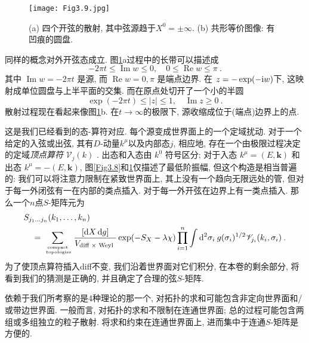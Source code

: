 \begin{figure}[h]
	\begin{center}
		\texttt{[image: Fig3.9.jpg]}\\
		\caption{(a) 四个开弦的散射, 其中弦源趋于$X^{0}=\pm \infty$. (b) 共形等价图像: 有凹痕的圆盘.}\label{Fig3.9}
	\end{center}
\end{figure}

同样的概念对外开弦态成立. 图\ref{Fig3.9}a过程中的长带可以描述成
\begin{equation}
-2 \pi t \leq \operatorname{Im} w \leq 0, \quad 0 \leq \operatorname{Re} w \leq \pi \:. \label{3.5.3}
\end{equation}
其中 $\operatorname{Im} w=-2 \pi t$ 是源, 而 $\operatorname{Re} w=0, \pi$ 是端点边界. 在 $z=-\exp (-\mathrm{i} w)$下, 这映射成单位圆盘与上半平面的交集. 而在原点处切开了一个小的半圆
\begin{equation}
\exp (-2 \pi t) \leq|z| \leq 1, \quad \operatorname{Im} z \geq 0 \:. \label{3.5.4}
\end{equation}
散射过程现在看起来像图\ref{Fig3.9}b. 在$t \rightarrow \infty$的极限下, 源收缩成位于(端点)边界上的点.

这是我们已经看到的态-算符对应. 每个源变成世界面上的一个定域扰动. 对于一个给定的入弦或出弦, 其有$D$-动量$k^{\mu}$以及内部态$j$, 相应地, 存在一个由极限过程决定的定域\emph{顶点算符} $\mathscr{V}_{j}(k)$ . 出态和入态由 $k^{0}$ 符号区分; 对于入态 $k^{\mu}=(E, \mathbf{k})$ 和出态 $k^{\mu}=-(E, \mathbf{k})$, 图\ref{Fig3.8}和\ref{Fig3.9}仅描述了最低阶振幅, 但这个构造是相当普遍的: 我们可以将注意力限制在紧致世界面上, 其上没有一个趋向无限远处的管, 但对于每一外闭弦有一在内部的类点插入. 对于每一外开弦在边界上有一类点插入. 那么一个$n$点$S$-矩阵元为
\begin{align}
&S_{j_{1} \ldots j_{n}}(k_{1}, \ldots, k_{n})  \nonumber \\
&\quad=\sum_{
	\text { compact } \atop \text { topologies}} \frac{[\mathrm{d} X \, \mathrm{d} g]}{V_{\text {diff } \times \text { Weyl }}} \exp (-S_{X}-\lambda \chi) 
	\prod_{i=1}^{n} \int \mathrm{d}^{2} \sigma_{i} \: g(\sigma_{i})^{1 / 2} \mathscr{V}_{j_{i}}(k_{i}, \sigma_{i}) \:. \label{3.5.5}
\end{align}
为了使顶点算符插入diff不变, 我们沿着世界面对它们积分, 在本卷的剩余部分, 将看到我们的猜测是正确的, 并且确定了合理的弦$S$-矩阵. 

依赖于我们所考察的是4种理论的那一个, 对拓扑的求和可能包含非定向世界面和/或带边世界面. 一般而言, 对拓扑的求和不限制在连通世界面; 总的过程可能包含两组或多组独立的粒子散射. 将求和约束在连通世界面上, 进而集中于连通$S$-矩阵是方便的. 

